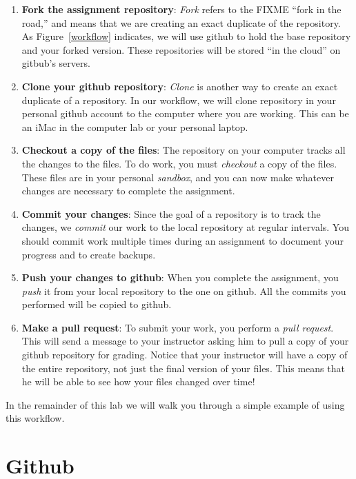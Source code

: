 \documentclass[11pt]{article}
\begin{document}
\begin{enumerate}
\item {\bf Fork the assignment repository}:  {\em Fork} refers to the FIXME ``fork in the road,'' and means that we are creating an exact duplicate of the repository.  As Figure~\ref{workflow} indicates, we will use github to hold the base repository and your forked version.  These repositories will be stored ``in the cloud'' on gitbub's servers.

\item {\bf Clone your github repository}:  {\em Clone} is another way to create an exact duplicate of a repository.  In our workflow, we will clone repository in your personal github account to the computer where you are working.  This can be an iMac in the computer lab or your personal laptop.

\item {\bf Checkout a copy of the files}:  The repository on your computer tracks all the changes to the files.  To do work, you must {\em checkout} a copy of the files.  These files are in your personal {\em sandbox}, and you can now make whatever changes are necessary to complete the assignment.

\item {\bf Commit your changes}:  Since the goal of a repository is to track the changes, we {\em commit} our work to the local repository at regular intervals.  You should commit work multiple times during an assignment to document your progress and to create backups.

\item {\bf Push your changes to github}:  When you complete the assignment, you {\em push} it from your local repository to the one on github.  All the commits you performed will be copied to github.

\item {\bf Make a pull request}:  To submit your work, you perform a {\em pull request}.  This will send a message to your instructor asking him to pull a copy of your github repository for grading.  Notice that your instructor will have a copy of the entire repository, not just the final version of your files.  This means that he will be able to see how your files changed over time!
\end{enumerate}

In the remainder of this lab we will walk you through a simple example of using this workflow.

\section*{Github}
\end{document}
